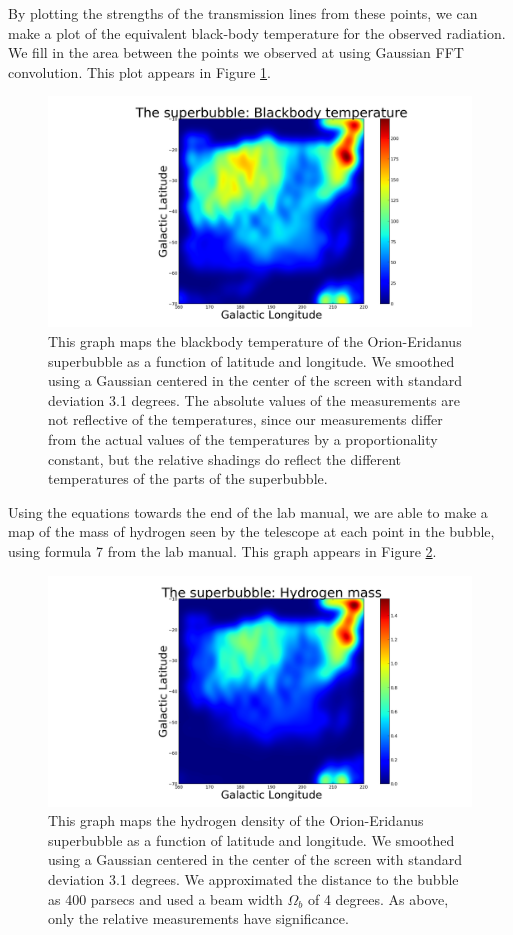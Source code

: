 \documentclass[11pt]{article}
\begin{document}
By plotting the strengths of the transmission lines from these points, we can make a plot of the equivalent black-body temperature for the observed radiation. We fill in the area between the points we observed at using Gaussian FFT convolution. This plot appears in Figure \ref{blackbody}.

\begin{figure}
\centering
\includegraphics[scale=0.35]{garphs/blackbody}
\caption{This graph maps the blackbody temperature of the Orion-Eridanus superbubble as a function of latitude and longitude. We smoothed using a Gaussian centered in the center of the screen with standard deviation 3.1 degrees. The absolute values of the measurements are not reflective of the temperatures, since our measurements differ from the actual values of the temperatures by a proportionality constant, but the relative shadings do reflect the different temperatures of the parts of the superbubble.\label{blackbody}}
\end{figure} 

Using the equations towards the end of the lab manual, we are able to make a map of the mass of hydrogen seen by the telescope at each point in the bubble, using formula 7 from the lab manual. This graph appears in Figure \ref{hydrogen}.

\begin{figure}
\centering
\includegraphics[scale=0.35]{garphs/hydrogen}
\caption{This graph maps the hydrogen density of the Orion-Eridanus superbubble as a function of latitude and longitude. We smoothed using a Gaussian centered in the center of the screen with standard deviation 3.1 degrees. We approximated the distance to the bubble as 400 parsecs and used a beam width $\Omega_b$ of 4 degrees. As above, only the relative measurements have significance. \label{hydrogen}}
\end{figure} 
\end{document}
